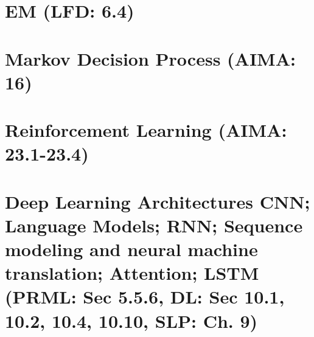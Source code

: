 \documentclass{article}
\begin{document}
\section{EM (LFD: 6.4)}


\section{Markov Decision Process (AIMA: 16)}


\section{Reinforcement Learning (AIMA: 23.1-23.4)}


\section{Deep Learning Architectures CNN; Language Models; RNN; Sequence modeling and neural machine translation; Attention; LSTM (PRML: Sec 5.5.6, DL: Sec 10.1, 10.2, 10.4, 10.10, SLP: Ch. 9)}

\end{document}
